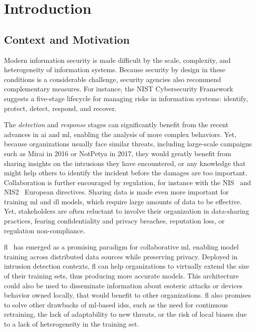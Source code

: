 \chapter{Introduction\label{chap:intro}}
\localtoc

\section{Context and Motivation\label{sec:intro.context}}

Modern information security is made difficult by the scale, complexity, and heterogeneity of information systems.
Because security by design in these conditions is a considerable challenge, security agencies also recommend complementary measures.
For instance, the NIST Cybersecurity Framework~\cite{nationalinstituteofstandardsandtechnology_NISTCybersecurityFramework_2024} suggests a five-stage lifecycle for managing risks in information systems: identify, protect, detect, respond, and recover.

The \emph{detection} and \emph{response} stages can significantly benefit from the recent advances in \gls{ai} and \gls{ml}, enabling the analysis of more complex behaviors.
Yet, because organizations usually face similar threats, including large-scale campaigns such as Mirai in 2016 or NotPetya in 2017, they would greatly benefit from sharing insights on the intrusions they have encountered, or any knowledge that might help others to identify the incident before the damages are too important.
Collaboration is further encouraged by regulation, for instance with the NIS~\cite{NIS_directive} and NIS2~\cite{NIS2} European directives.
Sharing data is made even more important for training \gls{ml} and \gls{dl} models, which require large amounts of data to be effective.
Yet, stakeholders are often reluctant to involve their organization in data-sharing practices, fearing confidentiality and privacy breaches, reputation loss, or regulation non-compliance.

\Gls{fl}~\cite{mcmahan_Communicationefficientlearningdeep_2017} has emerged as a promising paradigm for collaborative \gls{ml}, enabling model training across distributed data sources while preserving privacy.
Deployed in intrusion detection contexts, \gls{fl} can help organizations to virtually extend the size of their training sets, thus producing more accurate models.
This architecture could also be used to disseminate information about esoteric attacks or devices behavior owned locally, that would benefit to other organizations.
\Gls{fl} also promises to solve other drawbacks of \gls{ml}-based \glspl{ids}, such as the need for continuous retraining, the lack of adaptability to new threats, or the risk of local biases due to a lack of heterogeneity in the training set.

